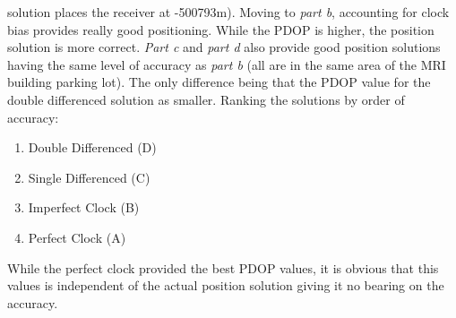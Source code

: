\documentclass[11pt]{article}
\begin{document}
\begin{enumerate}[label=\textbf{\arabic*.}]
  solution places the receiver at -500793m). Moving to \emph{part b}, accounting 
  for clock bias provides really good positioning. While the PDOP is higher, 
  the position solution is more correct. \emph{Part c} and \emph{part d} also 
  provide good position solutions having the same level of accuracy as \emph{part
  b} (all are in the same area of the MRI building parking lot). The only difference 
  being that the PDOP value for the double differenced solution as smaller. 
  Ranking the solutions by order of accuracy:
  \begin{enumerate}[1.]
    \itemsep -2pt 
    \item Double Differenced (D)
    \item Single Differenced (C)
    \item Imperfect Clock (B)
    \item Perfect Clock (A)
  \end{enumerate}
  While the perfect clock provided the best PDOP values, it is obvious that this 
  values is independent of the actual position solution giving it no bearing on 
  the accuracy.


\end{enumerate}
\end{document}
